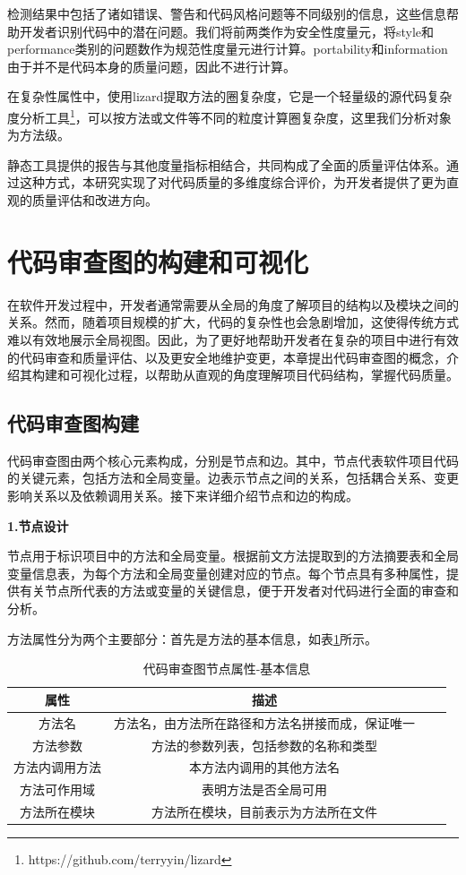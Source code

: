 检测结果中包括了诸如错误、警告和代码风格问题等不同级别的信息，这些信息帮助开发者识别代码中的潜在问题。我们将前两类作为安全性度量元，将style和performance类别的问题数作为规范性度量元进行计算。portability和information由于并不是代码本身的质量问题，因此不进行计算。

在复杂性属性中，使用lizard提取方法的圈复杂度，它是一个轻量级的源代码复杂度分析工具\footnote{https://github.com/terryyin/lizard}，可以按方法或文件等不同的粒度计算圈复杂度，这里我们分析对象为方法级。

静态工具提供的报告与其他度量指标相结合，共同构成了全面的质量评估体系。通过这种方式，本研究实现了对代码质量的多维度综合评价，为开发者提供了更为直观的质量评估和改进方向。

\section{代码审查图的构建和可视化}

在软件开发过程中，开发者通常需要从全局的角度了解项目的结构以及模块之间的关系。然而，随着项目规模的扩大，代码的复杂性也会急剧增加，这使得传统方式难以有效地展示全局视图。因此，为了更好地帮助开发者在复杂的项目中进行有效的代码审查和质量评估、以及更安全地维护变更，本章提出代码审查图的概念，介绍其构建和可视化过程，以帮助从直观的角度理解项目代码结构，掌握代码质量。

\subsection{代码审查图构建}

代码审查图由两个核心元素构成，分别是节点和边。其中，节点代表软件项目代码的关键元素，包括方法和全局变量。边表示节点之间的关系，包括耦合关系、变更影响关系以及依赖调用关系。接下来详细介绍节点和边的构成。

\noindent \textbf{1.节点设计}

节点用于标识项目中的方法和全局变量。根据前文方法提取到的方法摘要表和全局变量信息表，为每个方法和全局变量创建对应的节点。每个节点具有多种属性，提供有关节点所代表的方法或变量的关键信息，便于开发者对代码进行全面的审查和分析。

方法属性分为两个主要部分：首先是方法的基本信息，如表\ref{4_代码审查图节点属性-基本信息}所示。

\begin{table}[htbp]
\caption{代码审查图节点属性-基本信息}
\label{4_代码审查图节点属性-基本信息}
\vspace{0.5em}\centering\wuhao
\begin{tabular}{cccc}
\toprule
    属性 & 描述 \\
\midrule
方法名 & 方法名，由方法所在路径和方法名拼接而成，保证唯一  \\
方法参数 & 方法的参数列表，包括参数的名称和类型   \\
方法内调用方法 & 本方法内调用的其他方法名   \\
方法可作用域 & 表明方法是否全局可用   \\
方法所在模块 &  方法所在模块，目前表示为方法所在文件  \\ 
\bottomrule
\end{tabular}
\end{table}

